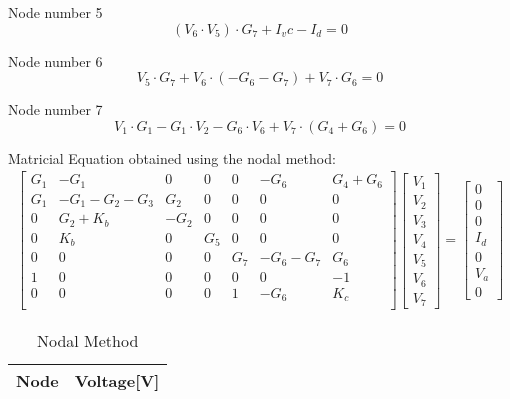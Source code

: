 Node number 5
\begin{equation}
  (V_6 \cdot V_5) \cdot G_7 + I_vc - I_d=0
  \label{eq:kcl5}
\end{equation}

Node number 6
\begin{equation}
 	V_5 \cdot G_7 + V_6\cdot (-G_6 -G_7) + V_7 \cdot G_6 =0
  \label{eq:kcl6}
\end{equation}

Node number 7
\begin{equation}
  V_1 \cdot G_1 - G_1 \cdot V_2 - G_6 \cdot V_6 + V_7 \cdot (G_4 + G_6)=0
  \label{eq:kcl7}
\end{equation}

Matricial Equation obtained using the nodal method:
\begin{gather}
	\begin{bmatrix}
		G_1 & -G_1 & 0 & 0 & 0 & -G_6 & G_4 + G_6 \\
		G_1 & -G_1 - G_2 - G_3 & G_2 & 0 & 0 & 0 & 0 \\
		0 & G_2 + K_b & -G_2 & 0 & 0 & 0 & 0 \\
		0 & K_b & 0 & G_5 & 0 & 0 & 0 \\
		0 & 0 & 0 & 0 & G_7 & -G_6 - G_7 & G_6 \\
		1 & 0 & 0 & 0 & 0 & 0 & -1 \\
		0 & 0 & 0 & 0 & 1 & -G_6 & K_c \\
	\end{bmatrix}
	\begin {bmatrix} V_1 \\ V_2 \\ V_3 \\ V_4  \\ V_5 \\ V_6 \\ V_7 \end{bmatrix}
	=
	\begin {bmatrix} 0  \\ 0  \\ 0  \\ I_d \\ 0  \\ V_a \\ 0 \end{bmatrix}
\end{gather}

\begin{table}[h]
  \centering
  \begin{tabular}{|l|r|}
    \hline    
    {\bf Node} & {\bf Voltage[V]} \\ \hline
    
  \end{tabular}
  \caption{Nodal Method}
  \label{tab:nodal}
\end{table}

